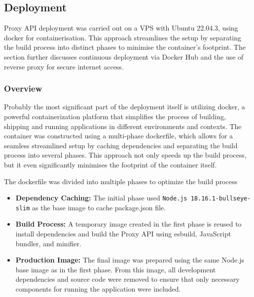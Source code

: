 \subsection{Deployment}
\label{subsec:deployment}


Proxy API deployment was carried out on a \ac{VPS} with Ubuntu 22.04.3, using \gls{docker} for containerisation.
This approach streamlines the setup by separating the build process into distinct phases to minimise the container's footprint.
The section further discusses continuous deployment via Docker Hub and the use of reverse proxy for secure internet access.

\subsubsection{Overview}
Probably the most significant part of the deployment itself is utilizing \gls{docker}, a powerful containerization platform that simplifies the process of building, shipping and running applications in different environments and contexts. 
The container was constructed using a multi-phase \gls{dockerfile}, which allows for a seamless streamlined setup by caching dependencies and separating the build process into several phases.
This approach not only speeds up the build process, but it even significantly minimises the footprint of the container itself.


The \gls{dockerfile} was divided into multiple phases to optimize the build process
\begin{itemize}
    \item \textbf{Dependency Caching:} The initial phase used \texttt{Node.js 18.16.1-bullseye-slim} as the base image to cache package.json file.
    \item \textbf{Build Process:} A temporary image created in the first phase is reused to install dependencies and build the Proxy API using \gls{esbuild}, JavaScript bundler, and minifier. 
    \item \textbf{Production Image:} The final image was prepared using the same Node.js base image as in the first phase. From this image, all development dependencies and source code were removed to ensure that only necessary components for running the application were included.
\end{itemize}

